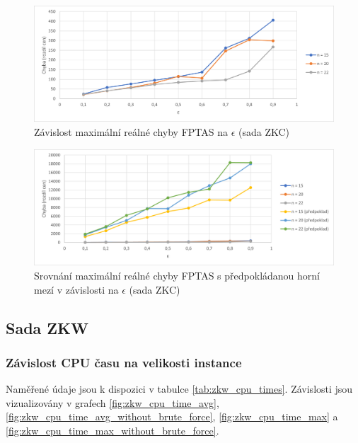 \documentclass[12pt]{article}
\begin{document}
\begin{figure}[ht]\centering
    \includegraphics[width=1\textwidth, keepaspectratio]{graphs/ZKC/fptas/zkc_fptas_eps_error.png}
    \caption{Závislost maximální reálné chyby FPTAS na $\epsilon$ (sada ZKC)}
    \label{fig:zkc_fptas_eps_error}
\end{figure}

\begin{figure}[ht]\centering
    \includegraphics[width=1\textwidth, keepaspectratio]{graphs/ZKC/fptas/zkc_fptas_eps_error_comparison.png}
    \caption{Srovnání maximální reálné chyby FPTAS s předpokládanou horní mezí v závislosti na $\epsilon$ (sada ZKC)}
    \label{fig:zkc_fptas_eps_error_comparison}
\end{figure}

\subsection{Sada ZKW}

\subsubsection{Závislost CPU času na velikosti instance}

Naměřené údaje jsou k dispozici v tabulce \ref{tab:zkw_cpu_times}. Závislosti jsou vizualizovány v grafech \ref{fig:zkw_cpu_time_avg}, \ref{fig:zkw_cpu_time_avg_without_brute_force}, \ref{fig:zkw_cpu_time_max} a \ref{fig:zkw_cpu_time_max_without_brute_force}.
\end{document}
